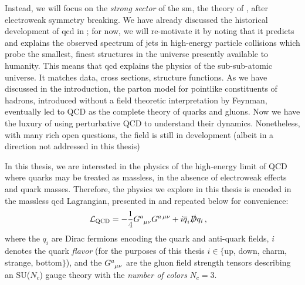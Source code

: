 Instead, we will focus on the \textit{strong sector} of the \gls{sm}, the theory of , after electroweak symmetry breaking.
%
We have already discussed the historical development of \gls{qcd} in ;
%
for now, we will re-motivate it by noting that it predicts and explains the observed spectrum of jets  in high-energy particle collisions which probe the smallest, finest structures in the universe presently available to humanity.
%
This means that \gls{qcd} explains the physics of the sub-sub-atomic universe.
%
It matches data, cross sections, structure functions.
%
As we have discussed in the introduction, the parton model for pointlike constituents of hadrons, introduced without a field theoretic interpretation by Feynman, eventually led to QCD as the complete theory of quarks and gluons.
%
Now we have the luxury of using perturbative QCD to understand their dynamics.
%
Nonetheless, with many rich open questions, the field is still in development (albeit in a direction not addressed in this thesis)

In this thesis, we are interested in the physics of the high-energy limit of QCD where quarks may be treated as massless, in the absence of electroweak effects and quark masses.
%
Therefore, the physics we explore in this thesis is encoded in the massless \gls{qcd} Lagrangian, presented in  and repeated below for convenience:
\begin{align}
    \mathcal{L}_\text{QCD}
    &=
    - \frac{1}{4} G\indices{^a_{\mu\nu}} G^{a\,\mu\nu}
    +
    i \overline{q}_i \slashed{D} q_i
    \,,
\end{align}
where the \(q_i\) are Dirac fermions encoding the quark and anti-quark fields, \(i\) denotes the quark \textit{flavor} (for the purposes of this thesis \(i \in \{\)up, down, charm, strange, bottom\(\}\)), and the \(G\indices{^a_{\mu\nu}}\) are the gluon field strength tensors describing an SU(\(N_c\)) gauge theory with the \textit{number of colors} \(N_c = 3\).


